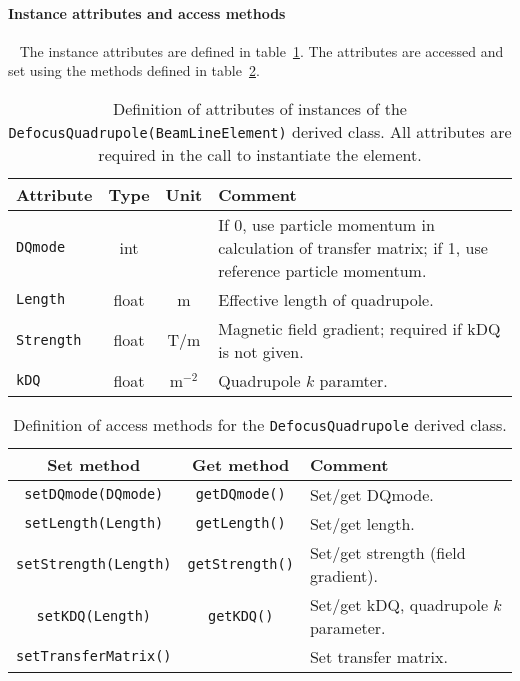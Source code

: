 \paragraph{Instance attributes and access methods} ~\newline
\label{SubSubSect:DQuad:InstAttr}
\noindent
The instance attributes are defined in
table~\ref{Tab:DQuad:Attributes}. 
The attributes are accessed and set using the methods defined in
table~\ref{Tab:DQuad:Methods}.
\begin{table}[h]
  \caption{
    Definition of attributes of instances of
    the \texttt{DefocusQuadrupole(BeamLineElement)} derived class.
    All attributes are required in the call to instantiate the
    element.
  }
  \label{Tab:DQuad:Attributes}
  \begin{center}
    \begin{tabular}{|l|c|c|p{10cm}|}
      \hline
      \textbf{Attribute}   & \textbf{Type} & \textbf{Unit} & \textbf{Comment}                    \\
      \hline
      \texttt{DQmode}   & int   &       & If 0, use particle momentum in calculation of transfer
                                          matrix; if 1, use reference particle momentum.         \\
      \texttt{Length}   & float & m     & Effective length of quadrupole.                        \\
      \texttt{Strength} & float & T/m   & Magnetic field gradient; required if kDQ is not given. \\
      \texttt{kDQ}      & float & m$^{-2}$ & Quadrupole $k$ paramter.                               \\
      \hline
    \end{tabular}
  \end{center}
\end{table}
\begin{table}[h]
  \caption{
    Definition of access methods for the \texttt{DefocusQuadrupole} derived
    class. 
  }
  \label{Tab:DQuad:Methods}
  \begin{center}
    \begin{tabular}{|c|c|p{7cm}|}
      \hline
      \textbf{Set method} & \textbf{Get method}  & \textbf{Comment}                                    \\
      \hline
      \texttt{setDQmode(DQmode)}   & \texttt{getDQmode()}   & Set/get DQmode.                        \\
      \texttt{setLength(Length)}   & \texttt{getLength()}   & Set/get length.                        \\
      \texttt{setStrength(Length)} & \texttt{getStrength()} & Set/get strength (field gradient).     \\
      \texttt{setKDQ(Length)}      & \texttt{getKDQ()}      & Set/get kDQ, quadrupole $k$ parameter. \\
      \texttt{setTransferMatrix()} &                        & Set transfer matrix.                   \\
      \hline
    \end{tabular}
  \end{center}
\end{table}

